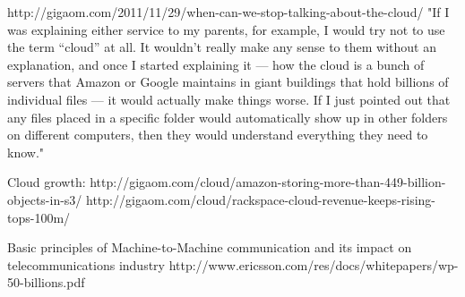			http://gigaom.com/2011/11/29/when-can-we-stop-talking-about-the-cloud/
				"If I was explaining either service to my parents, for example, I would try not to use the term “cloud” at all. It wouldn’t really make any sense to them without an explanation, and once I started explaining it — how the cloud is a bunch of servers that Amazon or Google maintains in giant buildings that hold billions of individual files — it would actually make things worse. If I just pointed out that any files placed in a specific folder would automatically show up in other folders on different computers, then they would understand everything they need to know."
			
			Cloud growth:
				http://gigaom.com/cloud/amazon-storing-more-than-449-billion-objects-in-s3/
				http://gigaom.com/cloud/rackspace-cloud-revenue-keeps-rising-tops-100m/
			
			Basic principles of Machine-to-Machine communication and its impact on telecommunications industry
				http://www.ericsson.com/res/docs/whitepapers/wp-50-billions.pdf
	
